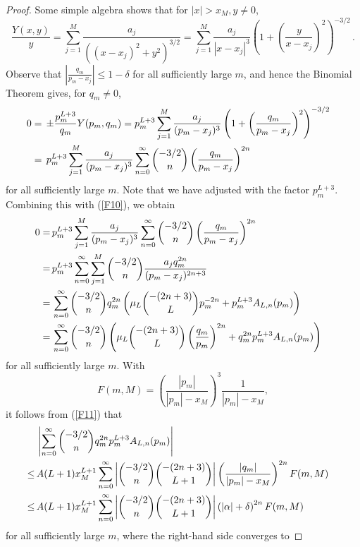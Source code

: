 \documentclass{article}
\theoremstyle{remark}
\numberwithin{equation}{section}
\begin{document}
\begin{proof}
Some simple algebra shows that for $|x| > x_M, y \neq 0$,
$$\frac{Y(x,y)}{y} = \sum_{j=1}^M{\frac{a_j}{((x-x_j)^2 + y^2)^{3/2}}} = 
\sum_{j=1}^M{\frac{a_j}{|x-x_j|^3} \left( 1 +  \left( \frac{y}{x-x_j} \right)^2 \right)^{-3/2}}\, .$$
Observe that $\displaystyle{\left| \frac{q_m}{p_m-x_j} \right| \leq 1-\delta}$ for all sufficiently large $m$, and hence the Binomial Theorem gives, for $q_m\not= 0$,
\begin{equation} \notag \begin{split}
0 & = \, \pm \frac{p_m^{L+3}}{q_m} Y(p_m,q_m) = p_m^{L+3} \sum_{j=1}^M{\frac{a_j}{(p_m-x_j)^3} \left( 1 +  \left( \frac{q_m}{p_m-x_j} \right)^2 \right)^{-3/2}} \cr 
& = \, p_m^{L+3} \sum_{j=1}^M{\frac{a_j}{(p_m-x_j)^3} \sum_{n=0}^\infty{\binom{-3/2}{n} \left( \frac{q_m}{p_m-x_j} \right)^{2n}}} \cr
\end{split} \end{equation}
for all sufficiently large $m$. Note that we have adjusted with the factor $p_m^{L+3}$. Combining this with (\ref{F10}), we obtain 
\begin{equation}\label{F12} 
\begin{split} 0 = & \, p_m^{L+3} \sum_{j=1}^M{\frac{a_j}{(p_m-x_j)^3} \sum_{n=0}^\infty{\binom {-3/2}{n} \left( \frac{q_m}{p_m-x_j} \right)^{2n}}} \cr 
= & \, p_m^{L+3} \sum_{n=0}^\infty{\sum_{j=1}^M{\binom{-3/2}{n} \frac{a_j q_m^{2n}}{(p_m-x_j)^{2n+3}}}} \cr
= & \, \sum_{n=0}^\infty{\binom {-3/2}{n} q_m^{2n} \left( \mu_L \binom{-(2n+3)}{L}p_m^{-2n} + p_m^{L+3}A_{L,n}(p_m) \right)} \cr 
= & \, \sum_{n=0}^\infty{\binom {-3/2}{n} \left( \mu_L \binom{-(2n+3)}{L} \left( \frac{q_m}{p_m} \right)^{2n} + q_m^{2n}p_m^{L+3}A_{L,n}(p_m) \right)}
\end{split} \end{equation}
for all sufficiently large $m$. With
$$ F(m,M) = \left( \frac{|p_m|}{|p_m|-x_M} \right)^3 \frac{1}{|p_m|-x_M}  , $$
it follows from (\ref{F11}) that
\begin{equation} \notag \begin{split}  
&  \, \left| \sum_{n=0}^\infty{ \binom {-3/2}{n} q_m^{2n}p_m^{L+3}A_{L,n}(p_m)} \right| \cr   
\leq & \, A(L+1)x_M^{L+1} \sum_{n=0}^\infty{ \left| \binom {-3/2}{n} \binom{-(2n+3)}{L+1} \right| \left( \frac{|q_m|}{|p_m|-x_M} \right)^{2n}  F(m,M)} \cr 
\leq & \, A(L+1)x_M^{L+1} \sum_{n=0}^\infty{ \left| \binom {-3/2}{n} \binom{-(2n+3)}{L+1} \right| \left( |\alpha| + \delta \right)^{2n} F(m,M)}
\end{split} \end{equation}
for all sufficiently large $m$, where the right-hand side converges to

\end{proof}
\end{document}
